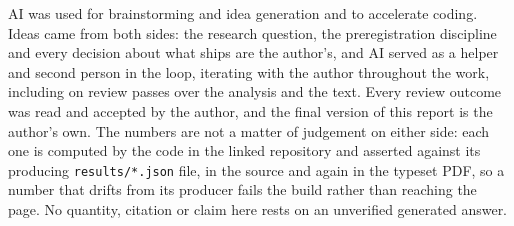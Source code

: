 \documentclass[11pt,a4paper]{article}
\begin{document}
AI was used for brainstorming and idea generation and to accelerate coding. Ideas came from both sides: the research question, the preregistration discipline and every decision about what ships are the author's, and AI served as a helper and second person in the loop, iterating with the author throughout the work, including on review passes over the analysis and the text. Every review outcome was read and accepted by the author, and the final version of this report is the author's own. The numbers are not a matter of judgement on either side: each one is computed by the code in the linked repository and asserted against its producing \texttt{results/*.json} file, in the source and again in the typeset PDF, so a number that drifts from its producer fails the build rather than reaching the page. No quantity, citation or claim here rests on an unverified generated answer.
\end{document}

